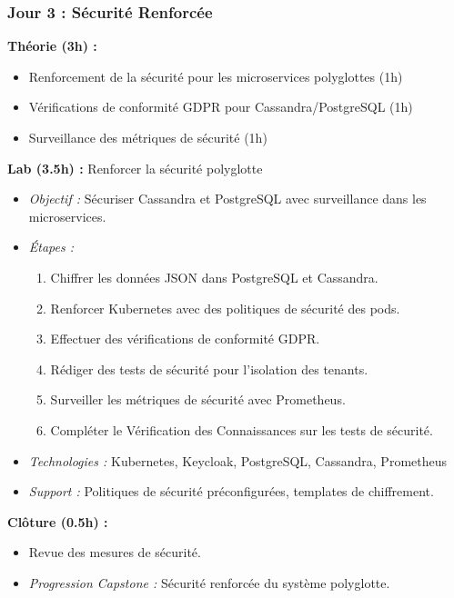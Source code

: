 \documentclass[11pt]{article}
\begin{document}
\subsubsection{Jour 3 : Sécurité Renforcée}
\textbf{Théorie (3h) :}
\begin{itemize}
    \item Renforcement de la sécurité pour les microservices polyglottes (1h)
    \item Vérifications de conformité GDPR pour Cassandra/PostgreSQL (1h)
    \item Surveillance des métriques de sécurité (1h)
\end{itemize}
\textbf{Lab (3.5h) :} Renforcer la sécurité polyglotte
\begin{itemize}
    \item \textit{Objectif :} Sécuriser Cassandra et PostgreSQL avec surveillance dans les microservices.
    \item \textit{Étapes :}
        \begin{enumerate}
            \item Chiffrer les données JSON dans PostgreSQL et Cassandra.
            \item Renforcer Kubernetes avec des politiques de sécurité des pods.
            \item Effectuer des vérifications de conformité GDPR.
            \item Rédiger des tests de sécurité pour l'isolation des tenants.
            \item Surveiller les métriques de sécurité avec Prometheus.
            \item Compléter le Vérification des Connaissances sur les tests de sécurité.
        \end{enumerate}
    \item \textit{Technologies :} Kubernetes, Keycloak, PostgreSQL, Cassandra, Prometheus
    \item \textit{Support :} Politiques de sécurité préconfigurées, templates de chiffrement.
\end{itemize}
\textbf{Clôture (0.5h) :}
\begin{itemize}
    \item Revue des mesures de sécurité.
    \item \textit{Progression Capstone :} Sécurité renforcée du système polyglotte.
\end{itemize}
\end{document}
